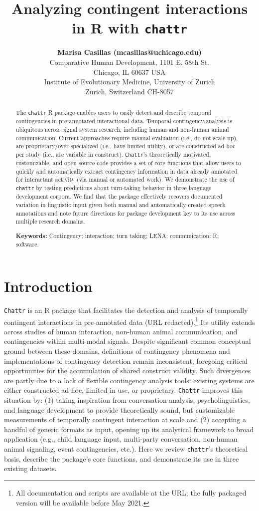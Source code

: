 \documentclass[10pt, letterpaper]{article}
\title{Analyzing contingent interactions in R with \texttt{chattr}}
\author{{\large \bf Marisa Casillas (mcasillas@uchicago.edu)} \\ Comparative Human Development, 1101 E. 58th St. \\ Chicago, IL 60637 USA \AND {\large \bf Camila Scaff (camila.scaff@iem.uzh.ch)} \\ Institute of Evolutionary Medicine, University of Zurich \\ Zurich, Switzerland CH-8057}
\begin{document}
\maketitle

\begin{abstract}
The \texttt{chattr} R package enables users to easily detect and
describe temporal contingencies in pre-annotated interactional data.
Temporal contingency analysis is ubiquitous across signal system
research, including human and non-human animal communication. Current
approaches require manual evaluation (i.e., do not scale up), are
proprietary/over-specialized (i.e., have limited utility), or are
constructed ad-hoc per study (i.e., are variable in construct).
\texttt{Chattr}'s theoretically motivated, customizable, and open source
code provides a set of core functions that allow users to quickly and
automatically extract contingency information in data already annotated
for interactant activity (via manual or automated work). We demonstrate
the use of \texttt{chattr} by testing predictions about turn-taking
behavior in three language development corpora. We find that the package
effectively recovers documented variation in linguistic input given both
manual and automatically created speech annotations and note future
directions for package development key to its use across multiple
research domains.

\textbf{Keywords:}
Contingency; interaction; turn taking; LENA; communication; R; software.
\end{abstract}

\hypertarget{introduction}{%
\section{Introduction}\label{introduction}}

\texttt{Chattr} is an R package that facilitates the detection and
analysis of temporally contingent interactions in pre-annotated data
(URL redacted).\footnote{All documentation and scripts are available at
  the URL; the fully packaged version will be available before May 2021.}
Its utility extends across studies of human interaction, non-human
animal communication, and contingencies within multi-modal signals.
Despite significant common conceptual ground between these domains,
definitions of contingency phenomena and implementations of contingency
detection remain inconsistent, foregoing critical opportunities for the
accumulation of shared construct validity. Such divergences are partly
due to a lack of flexible contingency analysis tools: existing systems
are either constructed ad-hoc, limited in use, or proprietary.
\texttt{Chattr} improves this situation by: (1) taking inspiration from
conversation analysis, psycholinguistics, and language development to
provide theoretically sound, but customizable measurements of temporally
contingent interaction at scale and (2) accepting a handful of generic
formats as input, opening up its analytical framework to broad
application (e.g., child language input, multi-party conversation,
non-human animal signaling, event contingencies, etc.). Here we review
\texttt{chattr}'s theoretical basis, describe the package's core
functions, and demonstrate its use in three existing datasets.
\end{document}
